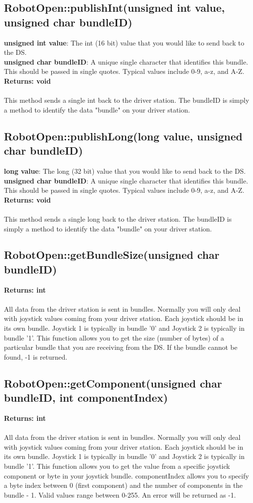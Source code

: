 \documentclass[11pt]{article} %
\begin{document}
\newpage

\subsection{RobotOpen::publishInt(unsigned int value, unsigned char bundleID)}
\textbf{unsigned int value}: The int (16 bit) value that you would like to send back to the DS.\\
\textbf{unsigned char bundleID}: A unique single character that identifies this bundle. This should be passed in single quotes. Typical values include 0-9, a-z, and A-Z.\\
\textbf{Returns: void}\\\\
This method sends a single int back to the driver station. The bundleID is simply a method to identify the data "bundle" on your driver station.
\subsection{RobotOpen::publishLong(long value, unsigned char bundleID)}
\textbf{long value}: The long (32 bit) value that you would like to send back to the DS.\\
\textbf{unsigned char bundleID}: A unique single character that identifies this bundle. This should be passed in single quotes. Typical values include 0-9, a-z, and A-Z.\\
\textbf{Returns: void}\\\\
This method sends a single long back to the driver station. The bundleID is simply a method to identify the data "bundle" on your driver station.
\subsection{RobotOpen::getBundleSize(unsigned char bundleID)}
\textbf{Returns: int}\\\\
All data from the driver station is sent in bundles. Normally you will only deal with joystick values coming from your driver station. Each joystick should be in its own bundle. Joystick 1 is typically in bundle '0' and Joystick 2 is typically in bundle '1'. This function allows you to get the size (number of bytes) of a particular bundle that you are receiving from the DS. If the bundle cannot be found, -1 is returned.
\subsection{RobotOpen::getComponent(unsigned char bundleID, int componentIndex)}
\textbf{Returns: int}\\\\
All data from the driver station is sent in bundles. Normally you will only deal with joystick values coming from your driver station. Each joystick should be in its own bundle. Joystick 1 is typically in bundle '0' and Joystick 2 is typically in bundle '1'. This function allows you to get the value from a specific joystick component or byte in your joystick bundle. componentIndex allows you to specify a byte index between 0 (first component) and the number of components in the bundle - 1. Valid values range between 0-255. An error will be returned as -1.
\newpage
\end{document}
